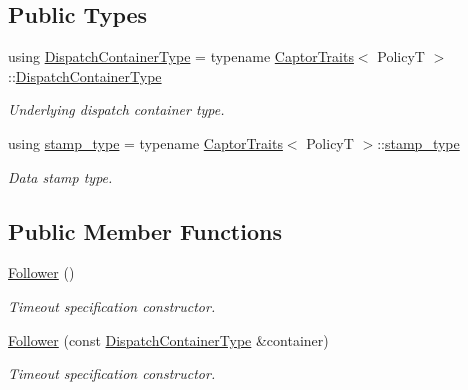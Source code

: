 \subsection*{Public Types}
\begin{DoxyCompactItemize}
\item 
\mbox{\label{classflow_1_1_follower_a2c30490de514f45d9cc287eb8baed5db}} 
using \hyperlink{classflow_1_1_follower_a2c30490de514f45d9cc287eb8baed5db}{Dispatch\+Container\+Type} = typename \hyperlink{structflow_1_1_captor_traits}{Captor\+Traits}$<$ PolicyT $>$\+::\hyperlink{classflow_1_1_follower_a2c30490de514f45d9cc287eb8baed5db}{Dispatch\+Container\+Type}
\begin{DoxyCompactList}\small\item\em Underlying dispatch container type. \end{DoxyCompactList}\item 
\mbox{\label{classflow_1_1_follower_a1388657aef71e23dd17a18ed7c628ae0}} 
using \hyperlink{classflow_1_1_follower_a1388657aef71e23dd17a18ed7c628ae0}{stamp\+\_\+type} = typename \hyperlink{structflow_1_1_captor_traits}{Captor\+Traits}$<$ PolicyT $>$\+::\hyperlink{classflow_1_1_follower_a1388657aef71e23dd17a18ed7c628ae0}{stamp\+\_\+type}
\begin{DoxyCompactList}\small\item\em Data stamp type. \end{DoxyCompactList}\end{DoxyCompactItemize}
\subsection*{Public Member Functions}
\begin{DoxyCompactItemize}
\item 
\mbox{\label{classflow_1_1_follower_a6f71e1ffc4a71045b70b289e792bd5fb}} 
\hyperlink{classflow_1_1_follower_a6f71e1ffc4a71045b70b289e792bd5fb}{Follower} ()
\begin{DoxyCompactList}\small\item\em Timeout specification constructor. \end{DoxyCompactList}\item 
\hyperlink{classflow_1_1_follower_a4637bd6e90b3e45cd42584cc873e771e}{Follower} (const \hyperlink{classflow_1_1_follower_a2c30490de514f45d9cc287eb8baed5db}{Dispatch\+Container\+Type} \&container)
\begin{DoxyCompactList}\small\item\em Timeout specification constructor. \end{DoxyCompactList}\end{DoxyCompactItemize}
